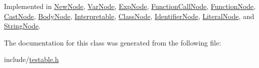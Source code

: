 Implemented in \hyperlink{classNewNode_a9be504d069e8a5d4ea13b4767a3c792a}{New\+Node}, \hyperlink{classVarNode_afaca674319775ae5e8a4fb0e5ec7b59f}{Var\+Node}, \hyperlink{classExpNode_a8fb8302d5ce438a9ad0f58161be2a1c9}{Exp\+Node}, \hyperlink{classFunctionCallNode_a5a7f576984942e2e39057d716d8a5547}{Function\+Call\+Node}, \hyperlink{classFunctionNode_a1f020e7ea0181b3ce16ad2ef8426f773}{Function\+Node}, \hyperlink{classCastNode_a19fa03c324a6dcbadac32965a86afb3e}{Cast\+Node}, \hyperlink{classBodyNode_a80e75b0ab6c388c34a82bdce63fdc7bb}{Body\+Node}, \hyperlink{classInterpretable_a32f547aaf68dcbab993284d3257ab010}{Interpretable}, \hyperlink{classClassNode_ac5147024d81a0c6841e9453025e4f988}{Class\+Node}, \hyperlink{classIdentifierNode_a1459965d8f22ade30cb78b2a1d60dd07}{Identifier\+Node}, \hyperlink{classLiteralNode_af55e4e5e668c9be666c0b6c24c3918f9}{Literal\+Node}, and \hyperlink{classStringNode_a3836ad2a1bb6f86cd52663653a65bad8}{String\+Node}.



The documentation for this class was generated from the following file\+:\begin{DoxyCompactItemize}
\item 
include/\hyperlink{testable_8h}{testable.\+h}\end{DoxyCompactItemize}

